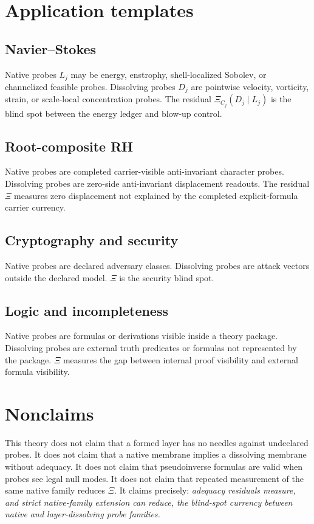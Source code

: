 \documentclass[11pt]{article}
\begin{document}
\section{Application templates}

\subsection{Navier--Stokes}
Native probes \(L_j\) may be energy, enstrophy, shell-localized Sobolev, or channelized feasible probes.  Dissolving probes \(D_j\) are pointwise velocity, vorticity, strain, or scale-local concentration probes.  The residual \(\Xi_{C_j}(D_j\mid L_j)\) is the blind spot between the energy ledger and blow-up control.

\subsection{Root-composite RH}
Native probes are completed carrier-visible anti-invariant character probes.  Dissolving probes are zero-side anti-invariant displacement readouts.  The residual \(\Xi\) measures zero displacement not explained by the completed explicit-formula carrier currency.

\subsection{Cryptography and security}
Native probes are declared adversary classes.  Dissolving probes are attack vectors outside the declared model.  \(\Xi\) is the security blind spot.

\subsection{Logic and incompleteness}
Native probes are formulas or derivations visible inside a theory package.  Dissolving probes are external truth predicates or formulas not represented by the package.  \(\Xi\) measures the gap between internal proof visibility and external formula visibility.

\section{Nonclaims}

This theory does not claim that a formed layer has no needles against undeclared probes.  It does not claim that a native membrane implies a dissolving membrane without adequacy.  It does not claim that pseudoinverse formulas are valid when probes see legal null modes.  It does not claim that repeated measurement of the same native family reduces \(\Xi\).  It claims precisely: \emph{adequacy residuals measure, and strict native-family extension can reduce, the blind-spot currency between native and layer-dissolving probe families.}
\end{document}

